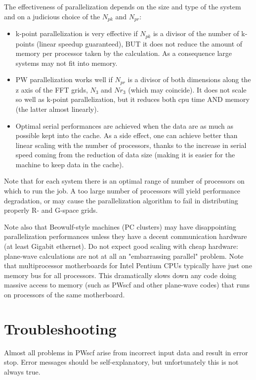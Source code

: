 \documentclass[12pt]{article}
\begin{document}
The effectiveness of parallelization depends on the size and
type of the system and on a judicious choice of the $N_{pk}$ 
and $N_{pr}$:
\begin{itemize}
\item
  k-point parallelization is very effective if $N_{pk}$ is a divisor of 
  the number of k-points (linear speedup guaranteed), BUT it does not
  reduce the amount of memory per processor taken by the calculation.
  As a consequence large systems may not fit into memory.
\item
  PW parallelization works well if $N_{pr}$ is a divisor of both dimensions
  along the z axis of the FFT grids, $N_3$ and $Nr_3$ (which may coincide).
  It does not scale so well as k-point parallelization, but it reduces
  both cpu time AND memory (the latter almost linearly).
\item
  Optimal serial performances are achieved when the data are as much
  as possible kept into the cache. As a side effect, one can achieve
  better than linear scaling with the number of processors, thanks to
  the increase in serial speed coming from the reduction of data size
  (making it is easier for the machine to keep data in the cache).  
\end{itemize}
Note that for each system there is an optimal range of number of 
processors on which to run the job. A too large number of processors 
will yield performance degradation, or may cause the parallelization
algorithm to fail in distributing properly  R- and G-space grids.

Note also that Beowulf-style machines (PC clusters) may have disappointing
parallelization performances unless they have a decent communication hardware
(at least Gigabit ethernet). Do not expect good scaling with cheap hardware: 
plane-wave calculations are not at all an "embarrassing parallel" problem. 
Note that multiprocessor motherboards for Intel Pentium CPUs typically
have just one memory bus for all processors. This dramatically slows down 
any code doing  massive access to memory (such as PWscf and other 
plane-wave codes) that runs on processors of the same motherboard.
\newpage

\section{Troubleshooting}

Almost all problems in PWscf arise from incorrect input data
and result in error stop. Error messages should be 
self-explanatory, but unfortunately this is not always true.
\end{document}
